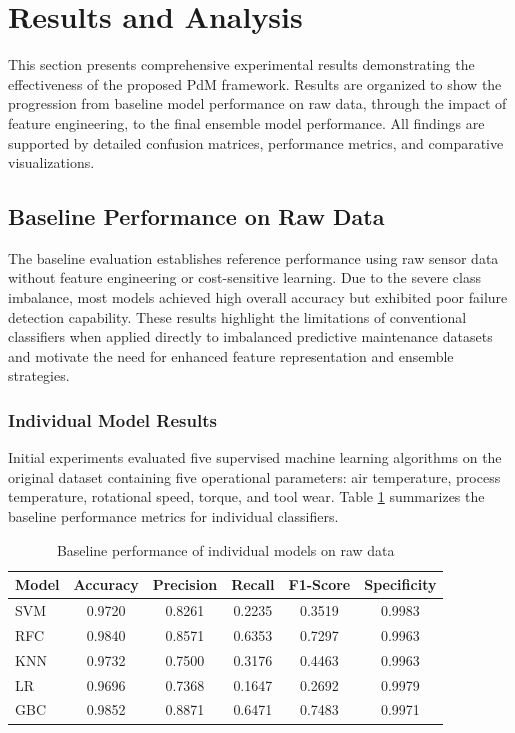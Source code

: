 \section{Results and Analysis}

This section presents comprehensive experimental results demonstrating the effectiveness of the proposed PdM framework. Results are organized to show the progression from baseline model performance on raw data, through the impact of feature engineering, to the final ensemble model performance. All findings are supported by detailed confusion matrices, performance metrics, and comparative visualizations.

\subsection{Baseline Performance on Raw Data}
The baseline evaluation establishes reference performance using raw sensor data without feature engineering or cost-sensitive learning. Due to the severe class imbalance, most models achieved high overall accuracy but exhibited poor failure detection capability. These results highlight the limitations of conventional classifiers when applied directly to imbalanced predictive maintenance datasets and motivate the need for enhanced feature representation and ensemble strategies.

\subsubsection{Individual Model Results}

Initial experiments evaluated five supervised machine learning algorithms on the original dataset containing five operational parameters: air temperature, process temperature, rotational speed, torque, and tool wear. Table \ref{tab:baseline_performance} summarizes the baseline performance metrics for individual classifiers.

\begin{table}[htbp]
\centering
\caption{Baseline performance of individual models on raw data}
\label{tab:baseline_performance}
\begin{tabular}{lccccc}
\hline
\textbf{Model} & \textbf{Accuracy} & \textbf{Precision} & \textbf{Recall} & \textbf{F1-Score} & \textbf{Specificity} \\
\hline
SVM & 0.9720 & 0.8261 & 0.2235 & 0.3519 & 0.9983 \\
RFC & 0.9840 & 0.8571 & 0.6353 & 0.7297 & 0.9963 \\
KNN & 0.9732 & 0.7500 & 0.3176 & 0.4463 & 0.9963 \\
LR & 0.9696 & 0.7368 & 0.1647 & 0.2692 & 0.9979 \\
GBC & 0.9852 & 0.8871 & 0.6471 & 0.7483 & 0.9971 \\
\hline
\end{tabular}
\end{table}

